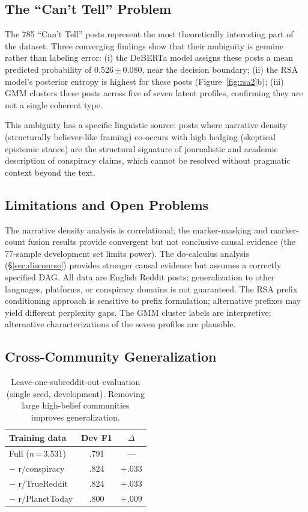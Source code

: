 \documentclass[11pt]{article}
\begin{document}
\subsection{The ``Can't Tell'' Problem}

The 785 ``Can't Tell'' posts represent the most theoretically interesting
part of the dataset.
Three converging findings show that their ambiguity is genuine rather
than labeling error:
(i) the DeBERTa model assigns these posts a mean predicted probability
of 0.526\,$\pm$\,0.080, near the decision boundary;
(ii) the RSA model's posterior entropy is highest for these posts
(Figure~\ref{fig:rsa2}b);
(iii) GMM clusters these posts across five of seven latent profiles,
confirming they are not a single coherent type.

This ambiguity has a specific linguistic source: posts where narrative
density (structurally believer-like framing) co-occurs with high
hedging (skeptical epistemic stance) are the structural signature of
journalistic and academic description of conspiracy claims, which cannot
be resolved without pragmatic context beyond the text.

\subsection{Limitations and Open Problems}

The narrative density analysis is correlational; the marker-masking
and marker-count fusion results provide convergent but not conclusive
causal evidence (the 77-sample development set limits power).
The do-calculus analysis (\S\ref{sec:discourse}) provides stronger
causal evidence but assumes a correctly specified DAG.
All data are English Reddit posts; generalization to other languages,
platforms, or conspiracy domains is not guaranteed.
The RSA prefix conditioning approach is sensitive to prefix formulation;
alternative prefixes may yield different perplexity gaps.
The GMM cluster labels are interpretive; alternative characterizations
of the seven profiles are plausible.

\subsection{Cross-Community Generalization}
\label{sec:subreddit_app}

\begin{table}[t]
\centering\small
\begin{tabular}{@{}lcc@{}}
\toprule
\textbf{Training data} & \textbf{Dev F1} & $\Delta$ \\
\midrule
Full ($n$\,=\,3,531)  & .791 & ---     \\
$-$ r/conspiracy       & .824 & $+$.033 \\
$-$ r/TrueReddit       & .824 & $+$.033 \\
$-$ r/PlanetToday      & .800 & $+$.009 \\
\bottomrule
\end{tabular}
\caption{Leave-one-subreddit-out evaluation (single seed, development).
Removing large high-belief communities improves generalization.}
\label{tab:subreddit}
\end{table}
\end{document}

